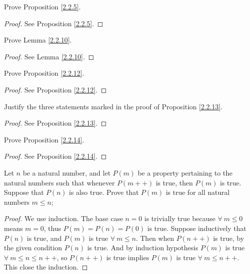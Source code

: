 \exercisesection

\begin{exercise}\label{ex 2.2.1}
Prove Proposition \ref{2.2.5}.
\end{exercise}

\begin{proof}
See Proposition \ref{2.2.5}.
\end{proof}

\begin{exercise}\label{ex 2.2.2}
Prove Lemma \ref{2.2.10}.
\end{exercise}

\begin{proof}
See Lemma \ref{2.2.10}.
\end{proof}

\begin{exercise}\label{ex 2.2.3}
Prove Proposition \ref{2.2.12}.
\end{exercise}

\begin{proof}
See Proposition \ref{2.2.12}.
\end{proof}

\begin{exercise}\label{ex 2.2.4}
Justify the three statements marked in the proof of Proposition \ref{2.2.13}.
\end{exercise}

\begin{proof}
See Proposition \ref{2.2.13}.
\end{proof}

\begin{exercise}\label{ex 2.2.5}
Prove Proposition \ref{2.2.14}.
\end{exercise}

\begin{proof}
See Proposition \ref{2.2.14}.
\end{proof}

\begin{exercise}\label{ex 2.2.6}
Let \(n\) be a natural number, and let \(P(m)\) be a property pertaining to the natural numbers such that whenever \(P(m++)\) is true, then \(P(m)\) is true.
Suppose that \(P(n)\) is also true.
Prove that \(P(m)\) is true for all natural numbers \(m \leq n\);
\end{exercise}

\begin{proof}
We use induction.
The base case \(n = 0\) is trivially true because \(\forall\ m \leq 0\) means \(m = 0\), thus \(P(m) = P(n) = P(0)\) is true.
Suppose inductively that \(P(n)\) is true, and \(P(m)\) is true \(\forall\ m \leq n\).
Then when \(P(n++)\) is true, by the given condition \(P(n)\) is true.
And by induction hypothesis \(P(m)\) is true \(\forall\ m \leq n \leq n++\), so \(P(n++)\) is true implies \(P(m)\) is true \(\forall\ m \leq n++\).
This close the induction.
\end{proof}